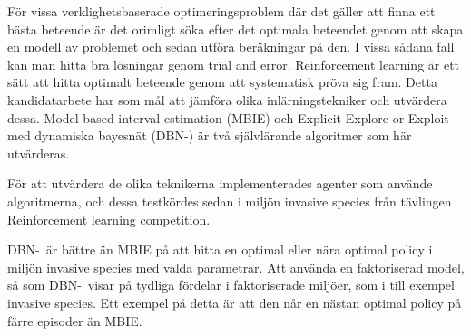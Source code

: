 För vissa verklighetsbaserade optimeringsproblem där det gäller att finna ett bästa beteende är det orimligt söka efter det optimala beteendet genom att skapa en modell av problemet och sedan utföra beräkningar på den. I vissa sådana fall kan man hitta bra lösningar genom trial and error. Reinforcement learning är ett sätt att hitta optimalt beteende genom att systematisk pröva sig fram.
Detta kandidatarbete har som mål att jämföra olika inlärningstekniker och utvärdera dessa.
Model-based interval estimation (MBIE) och Explicit Explore or Exploit med dynamiska bayesnät (DBN-\etre) är 
två självlärande algoritmer som här utvärderas.

För att utvärdera de olika teknikerna implementerades agenter som använde algoritmerna, och dessa testkördes sedan 
i miljön invasive species från tävlingen Reinforcement learning competition.

DBN-\etre\ är bättre än MBIE på att hitta en optimal eller nära optimal policy i miljön invasive species med valda parametrar.
Att använda en faktoriserad model, så som DBN-\etre\, visar på tydliga fördelar i faktoriserade miljöer, som i till exempel invasive species. 
Ett exempel på detta är att den når en nästan optimal policy på färre episoder än MBIE.





